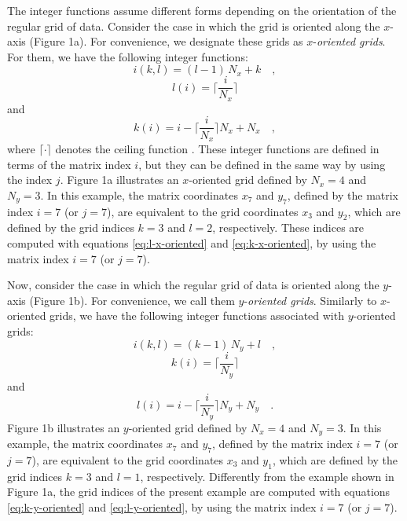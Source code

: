 \documentclass[manuscript,revised]{geophysics}
\begin{document}
The integer functions assume different forms depending on the 
orientation of the regular grid of data.
Consider the case in which the grid is oriented along the
$x$-axis (Figure 1a). For convenience, we designate these grids as 
$x$-\textit{oriented grids}. For them, we have the following integer functions:
\begin{equation}
i(k, l) = (l - 1) \, N_{x} + k \quad ,
\label{eq:i-x-oriented}
\end{equation}
\begin{equation}
l(i) = \Bigg\lceil \frac{i}{N_{x}} \Bigg\rceil
\label{eq:l-x-oriented}
\end{equation}
and
\begin{equation}
k(i)  = i - \Bigg\lceil \frac{i}{N_{x}} \Bigg\rceil N_{x} + N_{x} \quad ,
\label{eq:k-x-oriented}
\end{equation}
where $\lceil \cdot \rceil$ denotes the ceiling function \citep[][ p. 67]{graham-etal1994}.
These integer functions are defined in terms of the matrix index $i$, but they can 
be defined in the same way by using the index $j$.
Figure 1a illustrates an $x$-oriented grid defined by $N_{x} = 4$ and $N_{y} = 3$.
In this example, the matrix coordinates $x_{7}$ and $y_{7}$, defined by the matrix index $i = 7$ (or $j = 7$), 
are equivalent to the grid coordinates $x_{3}$ and $y_{2}$, which are defined by the grid indices
$k = 3$ and $l = 2$, respectively. These indices are computed with equations \ref{eq:l-x-oriented}
and \ref{eq:k-x-oriented}, by using the matrix index $i = 7$ (or $j = 7$).

Now, consider the case in which the regular grid of data is oriented along 
the $y$-axis (Figure 1b). For convenience, we call them $y$-\textit{oriented grids}.
Similarly to $x$-oriented grids, we have the following integer functions associated with
$y$-oriented grids:
\begin{equation}
i(k, l) = (k - 1) \, N_{y} + l \quad ,
\label{eq:i-y-oriented}
\end{equation}
\begin{equation}
k(i) = \Bigg\lceil \frac{i}{N_{y}} \Bigg\rceil
\label{eq:k-y-oriented}
\end{equation}
and
\begin{equation}
l(i) = i - \Bigg\lceil \frac{i}{N_{y}} \Bigg\rceil N_{y} + N_{y} \quad .
\label{eq:l-y-oriented}
\end{equation}
Figure 1b illustrates an $y$-oriented grid defined by $N_{x} = 4$ and $N_{y} = 3$.
In this example, the matrix coordinates $x_{7}$ and $y_{7}$, defined by the matrix index 
$i = 7$ (or $j = 7$), are equivalent to the grid coordinates $x_{3}$ and $y_{1}$, which are 
defined by the grid indices $k = 3$ and $l = 1$, respectively. Differently from the example
shown in Figure 1a, the grid indices of the present example are 
computed with equations \ref{eq:k-y-oriented} and \ref{eq:l-y-oriented}, by using the 
matrix index $i = 7$ (or $j = 7$).
\end{document}
